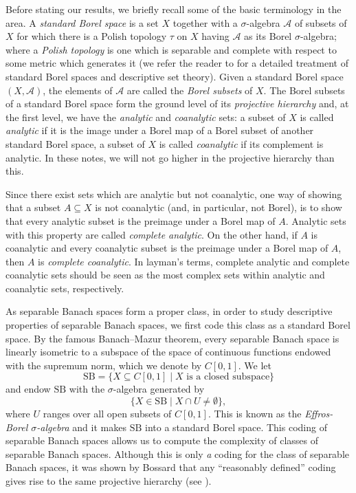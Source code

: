 \documentclass[letterpaper]{amsart}
\numberwithin{equation}{section}
\theoremstyle{definition}
\newcommand{\SB}{\mathrm{SB}}
\begin{document}
Before stating our results, we briefly recall some of the basic terminology in the area. A \emph{standard Borel space} is a set $X$ together with a $\sigma$-algebra $\mathcal  A$ of subsets of $X$ for which there is a Polish topology $\tau$ on $X$ having $\mathcal A$ as its Borel $\sigma$-algebra; where a \emph{Polish topology} is one which is separable and complete with respect to some metric which generates it (we refer the reader to \cite{KechrisBook1995} for a detailed treatment of standard Borel spaces and descriptive set theory). Given a standard Borel space $(X,\mathcal A)$, the elements of $\mathcal A$ are called the \emph{Borel subsets} of $X$. The Borel subsets of a standard Borel space form the ground level of its \emph{projective hierarchy} and, at the first level, we have the \emph{analytic} and \emph{coanalytic} sets: a subset of $X$ is called \emph{analytic} if it is the image under a Borel map of a Borel subset of another standard Borel space, a subset of $X$ is called \emph{coanalytic} if its complement is analytic. In these notes, we will not go higher in the projective hierarchy than this.

Since there exist sets which are analytic but not coanalytic, one way of showing that a subset $A\subseteq X$ is not coanalytic (and, in particular, not Borel), is to show that every analytic subset is the preimage under a Borel map of $A$. Analytic sets  with this property are called \emph{complete analytic}. On the other hand, if $A$ is coanalytic and every coanalytic subset is the preimage under a Borel map of $A$, then $A$ is \emph{complete coanalytic}. In layman's terms, complete analytic and complete coanalytic sets should be seen as the most complex sets within analytic and coanalytic sets, respectively. 


 

As separable Banach spaces form a proper class, in order to study descriptive properties of separable Banach spaces, we   first code this class as a standard Borel space.   By the famous Banach--Mazur theorem, every separable Banach space is linearly isometric to a subspace of the space of continuous functions endowed with the supremum norm, which we denote by $C[0,1]$. We let 
\[\SB=\{X\subseteq C[0,1]\mid X\text{ is a closed subspace}\}\]
and endow $\SB$ with the $\sigma$-algebra generated by 
\[\{X\in \SB\mid X\cap U\neq \emptyset\},\]
where $U$ ranges over all open subsets of $C[0,1]$. This is known as the  
\emph{Effros-Borel $\sigma$-algebra} and it makes $\SB$ into a standard Borel space. This coding of separable Banach spaces allows us to compute the complexity of classes of separable Banach spaces. Although this is only \emph{a} coding for the class of separable Banach spaces, it was shown by  Bossard that any ``reasonably defined'' coding gives rise to the same projective hierarchy  (see \cite[Proposition 2.8]{Bossard2002Fund}).
\end{document}
